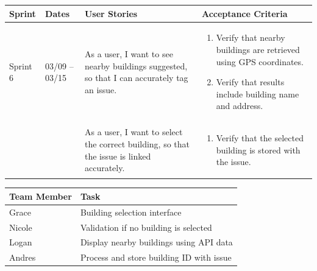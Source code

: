\documentclass[12pt]{article}
\begin{document}
\vspace{0.5em}

\noindent
\begin{tabular}{|L{1.2cm}|L{1.8cm}|L{5.2cm}|L{6.3cm}|}
\hline
\textbf{Sprint} & \textbf{Dates} & \textbf{User Stories} & \textbf{Acceptance Criteria} \\
\hline
Sprint 6 & 03/09 -- 03/15 &
As a user, I want to see nearby buildings suggested, so that I can accurately tag an issue. &
\begin{enumerate}
    \item Verify that nearby buildings are retrieved using GPS coordinates.
    \item Verify that results include building name and address.
\end{enumerate} \\
& &
As a user, I want to select the correct building, so that the issue is linked accurately. &
\begin{enumerate}
    \item Verify that the selected building is stored with the issue.
\end{enumerate} \\
\hline
\end{tabular}

\vspace{0.5em}

\noindent
\begin{tabular}{|L{2.5cm}|L{12.5cm}|}
\hline
\textbf{Team Member} & \textbf{Task} \\
\hline
Grace & Building selection interface \\
\hline
Nicole & Validation if no building is selected \\
\hline
Logan & Display nearby buildings using API data \\
\hline
Andres & Process and store building ID with issue \\
\hline
\end{tabular}

\vspace{2em}



\vspace{0.5em}
\end{document}
